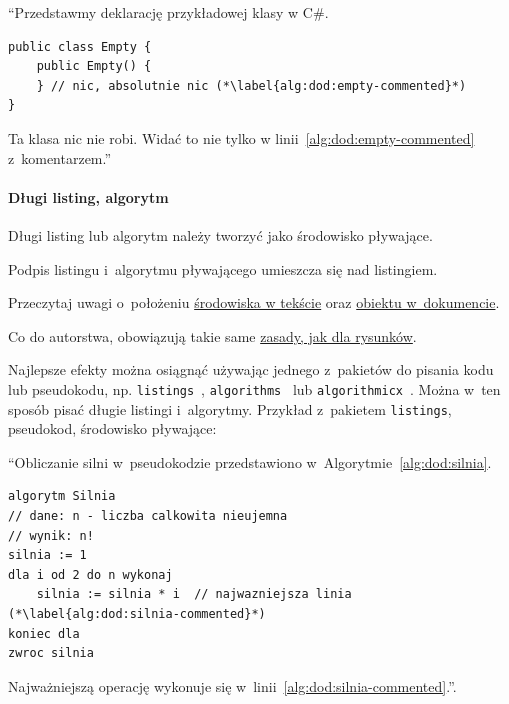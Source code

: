 
``Przedstawmy deklarację przykładowej klasy w C\#.
\begin{lstlisting}
public class Empty {
    public Empty() { 
    } // nic, absolutnie nic (*\label{alg:dod:empty-commented}*)
}
\end{lstlisting}
Ta klasa nic nie robi. Widać to nie tylko w linii~\ref{alg:dod:empty-commented} z~komentarzem.''


\paragraph{Długi listing, algorytm}
\label{sec:dod:listing-dlugi}

Długi listing lub algorytm należy tworzyć jako środowisko pływające.

Podpis listingu i~algorytmu pływającego umieszcza się nad listingiem.

Przeczytaj uwagi o~położeniu \hyperref[sec:dod:plywajace-tekst]{środowiska w tekście} oraz \hyperref[sec:dod:plywajace-dokument]{obiektu w~dokumencie}.

Co do autorstwa, obowiązują takie same \hyperref[sec:dod:rysunekautorstwo]{zasady, jak dla rysunków}.

Najlepsze efekty można osiągnąć używając jednego z~pakietów do pisania kodu lub pseudokodu, np. {\tt listings}~, {\tt algorithms}~ lub {\tt algorithmicx}~. Można w~ten sposób pisać długie listingi i~algorytmy. Przykład z~pakietem {\tt listings}, pseudokod, środowisko pływające:

``Obliczanie silni w~pseudokodzie przedstawiono w~Algorytmie~\ref{alg:dod:silnia}.
\renewcommand{\lstlistingname}{Algorytm}%
\renewcommand{\lstlistlistingname}{Spis algorytmów}%
%
\lstset{
    language=pseudocode,
    breaklines=true,
}%
\begin{lstlisting}[float=t, caption={Obliczanie silni metodą iteracyjną.}, label=alg:dod:silnia]
algorytm Silnia
// dane: n - liczba calkowita nieujemna
// wynik: n!
silnia := 1
dla i od 2 do n wykonaj
    silnia := silnia * i  // najwazniejsza linia (*\label{alg:dod:silnia-commented}*)
koniec dla
zwroc silnia
\end{lstlisting}
Najważniejszą operację wykonuje się w~linii~\ref{alg:dod:silnia-commented}.''.

